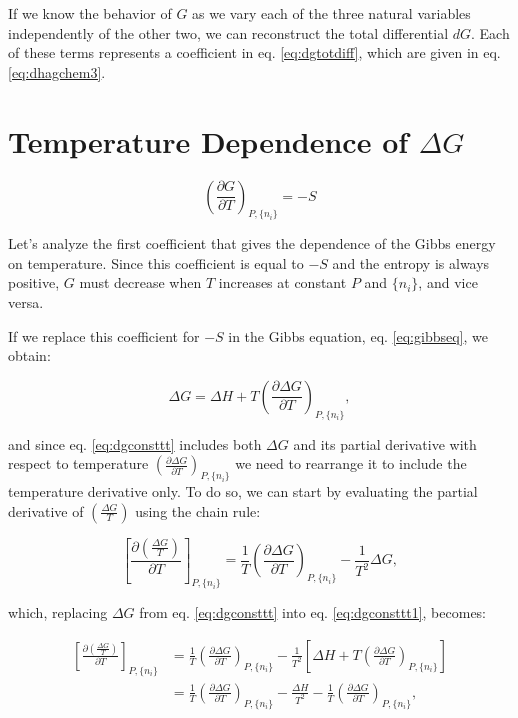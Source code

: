 \documentclass[
  9pt,
]{extbook}
\theoremstyle{definition}
\theoremstyle{definition}
\theoremstyle{definition}
\theoremstyle{remark}
\begin{document}
If we know the behavior of \(G\) as we vary each of the three natural variables independently of the other two, we can reconstruct the total differential \(dG\). Each of these terms represents a coefficient in eq. \eqref{eq:dgtotdiff}, which are given in eq. \eqref{eq:dhagchem3}.

\hypertarget{temperature-dependence-of-delta-g}{%
\section{\texorpdfstring{Temperature Dependence of \(\Delta G\)}{Temperature Dependence of \textbackslash Delta G}}\label{temperature-dependence-of-delta-g}}

\[
\left(\frac{\partial G}{\partial T} \right)_{P,\{n_i\}}=-S
\]

Let's analyze the first coefficient that gives the dependence of the Gibbs energy on temperature. Since this coefficient is equal to \(-S\) and the entropy is always positive, \(G\) must decrease when \(T\) increases at constant \(P\) and \(\{n_i\}\), and vice versa.

If we replace this coefficient for \(-S\) in the Gibbs equation, eq. \eqref{eq:gibbseq}, we obtain:

\begin{equation}
\Delta G = \Delta H + T \left(\frac{\partial \Delta G}{\partial T} \right)_{P,\{n_i\}},
\label{eq:dgconsttt}
\end{equation}

and since eq. \eqref{eq:dgconsttt} includes both \(\Delta G\) and its partial derivative with respect to temperature \(\left(\frac{\partial \Delta G}{\partial T} \right)_{P,\{n_i\}}\) we need to rearrange it to include the temperature derivative only. To do so, we can start by evaluating the partial derivative of \(\left( \frac{\Delta G}{T} \right)\) using the chain rule:

\begin{equation}
\left[ \frac{\partial\left( \frac{\Delta G}{T} \right)}{\partial T} \right]_{P,\{n_i\}} = \frac{1}{T} \left(\frac{\partial \Delta G}{\partial T}  \right)_{P,\{n_i\}} - \frac{1}{T^2}\Delta G,
\label{eq:dgconsttt1}
\end{equation}

which, replacing \(\Delta G\) from eq. \eqref{eq:dgconsttt} into eq. \eqref{eq:dgconsttt1}, becomes:

\begin{equation}
\begin{aligned}
\left[ \frac{\partial\left( \frac{\Delta G}{T} \right)}{\partial T} \right]_{P,\{n_i\}} &= \frac{1}{T} \left(\frac{\partial \Delta G}{\partial T}  \right)_{P,\{n_i\}} - \frac{1}{T^2} \left[ \Delta H + T \left(\frac{\partial \Delta G}{\partial T} \right)_{P,\{n_i\}} \right] \\
&= \frac{1}{T} \left(\frac{\partial \Delta G}{\partial T}  \right)_{P,\{n_i\}}- \frac{\Delta H}{T^2}-\frac{1}{T} \left(\frac{\partial \Delta G}{\partial T}  \right)_{P,\{n_i\}},
\end{aligned}
\label{eq:dgconsttt2}
\end{equation}
\end{document}
